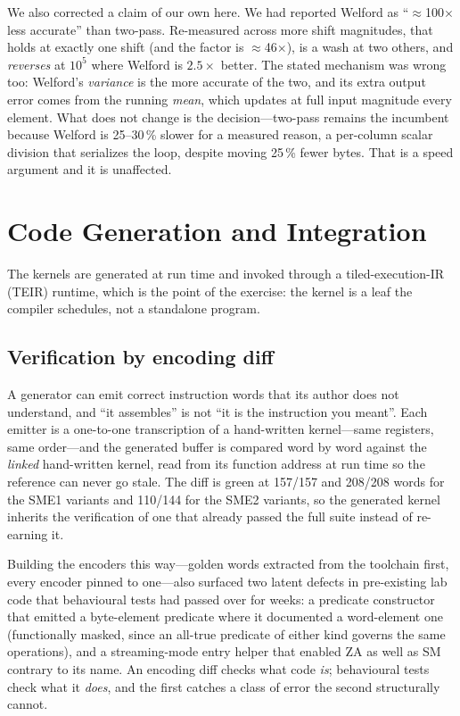 \documentclass[conference,10pt]{IEEEtran}
\begin{document}
We also corrected a claim of our own here. We had reported Welford as
``$\approx$100$\times$ less accurate'' than two-pass. Re-measured across more
shift magnitudes, that holds at exactly one shift (and the factor is
$\approx$46$\times$), is a wash at two others, and \emph{reverses} at $10^5$
where Welford is $2.5\times$ better. The stated mechanism was wrong too:
Welford's \emph{variance} is the more accurate of the two, and its extra output
error comes from the running \emph{mean}, which updates at full input magnitude
every element. What does not change is the decision---two-pass remains the
incumbent because Welford is 25--30\,\% slower for a measured reason, a
per-column scalar division that serializes the loop, despite moving 25\,\% fewer
bytes. That is a speed argument and it is unaffected.

\section{Code Generation and Integration}
\label{sec:jit}

The kernels are generated at run time and invoked through a tiled-execution-IR
(TEIR) runtime, which is the point of the exercise: the kernel is a leaf the
compiler schedules, not a standalone program.

\subsection{Verification by encoding diff}

A generator can emit correct instruction words that its author does not
understand, and ``it assembles'' is not ``it is the instruction you meant''.
Each emitter is a one-to-one transcription of a hand-written kernel---same
registers, same order---and the generated buffer is compared word by word
against the \emph{linked} hand-written kernel, read from its function address at
run time so the reference can never go stale. The diff is green at 157/157 and
208/208 words for the SME1 variants and 110/144 for the SME2 variants, so the
generated kernel inherits the verification of one that already passed the full
suite instead of re-earning it.

Building the encoders this way---golden words extracted from the toolchain
first, every encoder pinned to one---also surfaced two latent defects in
pre-existing lab code that behavioural tests had passed over for weeks: a
predicate constructor that emitted a byte-element predicate where it documented
a word-element one (functionally masked, since an all-true predicate of either
kind governs the same operations), and a streaming-mode entry helper that
enabled ZA as well as SM contrary to its name. An encoding diff checks what code
\emph{is}; behavioural tests check what it \emph{does}, and the first catches a
class of error the second structurally cannot.
\end{document}
